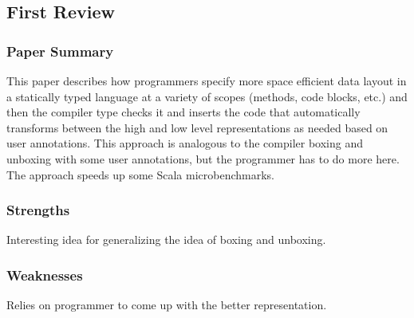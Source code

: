 \documentclass[9pt]{article}
\newenvironment{packed_item}{
\begin{itemize}
  \setlength{\itemsep}{1pt}
  \setlength{\parskip}{0.2pt}
  \setlength{\parsep}{0.2pt}
}{
  \end{itemize}
}
\newenvironment{reviewer-addr}
{ \color{OliveGreen} \framebox{{\bf FEEDBACK}} }
{  }
\begin{document}
\subsection{First Review}

\subsubsection{Paper Summary}

This paper describes how programmers specify more space efficient data layout in a statically typed language at a variety of scopes (methods, code blocks, etc.) and then the compiler type checks it and inserts the code that automatically transforms between the high and low level representations as needed based on user annotations.  This approach is analogous to the compiler boxing and unboxing with some user annotations, but the programmer has to do more here. The approach speeds up some Scala microbenchmarks.

\vspace{5mm}

\subsubsection{Strengths}

\begin{packed_item}
\item Interesting idea for generalizing the idea of boxing and unboxing.
\end{packed_item}

\vspace{5mm}

\subsubsection{Weaknesses}

\begin{reviewer-addr}
\begin{packed_item}
\item Relies on programmer to come up with the better representation.
\end{packed_item}
\end{reviewer-addr}
\end{document}

